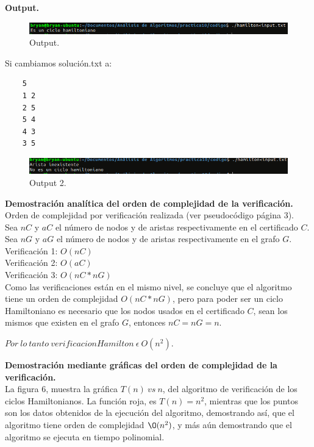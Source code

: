 \documentclass[12pt]{report}
\begin{document}
	\newpage
\textbf{Output.}
	\begin{figure}[H]
		\includegraphics[width=16cm]{imagenes/4.png}
		\centering
		\caption{Output.}
		\centering
	\end{figure}
	
	Si cambiamos solución.txt a:
	\lstset{language=c, breaklines=true, basicstyle=\footnotesize}
	\lstset{numbers=left, numberstyle=\tiny, stepnumber=1, numbersep=10pt}
	\begin{lstlisting}
	5	
	1 2	
	2 5
	5 4
	4 3
	3 5
	\end{lstlisting}

	\begin{figure}[H]
		\includegraphics[width=16cm]{imagenes/5.png}
		\centering
		\caption{Output 2.}
		\centering
	\end{figure}
	
	\textbf{Demostración analítica del orden de complejidad de la verificación.}\\
	
	Orden de complejidad por verificación realizada (ver pseudocódigo página 3).\\
	Sea $nC$ y $aC$ el número de nodos y de aristas respectivamente en el certificado $C$.\\
	Sea $nG$ y $aG$ el número de nodos y de aristas respectivamente en el grafo $G$.\\
	Verificación 1: $O(nC)$\\
	Verificación 2: $O(aC)$\\
	Verificación 3: $O(nC*nG)$\\
	
	Como las verificaciones están en el mismo nivel, se concluye que el algoritmo tiene un orden de complejidad $O(nC*nG)$, pero para poder ser un ciclo Hamiltoniano es necesario que los nodos usados en el certificado $C$, sean los mismos que existen en el grafo $G$, entonces $nC=nG=n$.
	
	$Por \ lo \ tanto \ verificacionHamilton \ \epsilon \ O(n^2).$
	
	\newpage
	\textbf{Demostración mediante gráficas del orden de complejidad de la verificación.}\\
	
	La figura 6, muestra la gráfica $T(n) \ vs \ n$, del algoritmo de verificación de los ciclos Hamiltonianos. La función roja, es $T(n)=n^{2}$, mientras que los puntos son los datos obtenidos de la ejecución del algoritmo, demostrando así, que el algoritmo tiene orden de complejidad $\O(n^2)$, y más aún demostrando que el algoritmo se ejecuta en tiempo polinomial.\\
	
\end{document}
